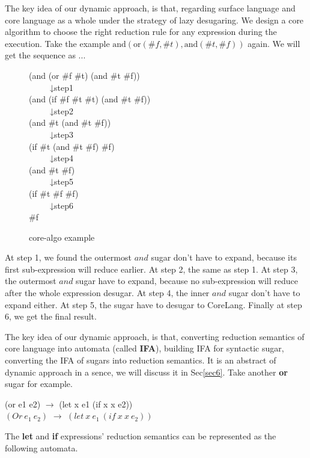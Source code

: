 The key idea of our dynamic approach, is that, regarding surface language and core language as a whole under the strategy of lazy desugaring. We design a core algorithm to choose the right reduction rule for any expression during the execution. Take the example $\mbox{and}(\mbox{or}(\#f, \#t), \mbox{and}(\#t, \#f))$ again. We will get the sequence as ...

\begin{figure}[ht]
\parbox[t]{\textwidth}{
			\begin{center}  
				(and (or \#f \#t) (and \#t \#f))\\
				~~~~~↓step1\\
				(and (if \#f \#t \#t) (and \#t \#f))\\
				~~~~~↓step2\\
				(and \#t (and \#t \#f))\\
				~~~~~↓step3\\
				(if \#t (and \#t \#f) \#f)\\
				~~~~~↓step4\\
				(and \#t \#f)\\
				~~~~~↓step5\\
				(if \#t \#f \#f)\\
				~~~~~↓step6\\
				\#f
			\end{center}  
		}
\caption{core-algo example}
\label{fig:core-algo}
\end{figure}

At step 1, we found the outermost $and$ sugar don't have to expand, because its first sub-expression will reduce earlier. At step 2, the same as step 1. At step 3, the outermost $and$ sugar have to expand, because no sub-expression will reduce after the whole expression desugar. At step 4, the inner $and$ sugar don't have to expand either. At step 5, the sugar have to desugar to CoreLang. Finally at step 6, we get the final result.

The key idea of our dynamic approach, is that, converting reduction semantics of core language into automata (called {\bfseries IFA}), building IFA for syntactic sugar, converting the IFA of sugars into reduction semantics. It is an abstract of dynamic approach in a sence, we will discuss it in Sec\ref{sec6}. Take another {\bfseries or} sugar for example.
\begin{flushleft}
	(or e1 e2) $\rightarrow$ (let x e1 (if x x e2))\\
	$(Or~e_1~e_2)$ $\rightarrow$ $(let~x~e_1~(if~x~x~e_2))$
\end{flushleft}  
The {\bfseries let} and {\bfseries if} expressions' reduction semantics can be represented as  the following automata.

